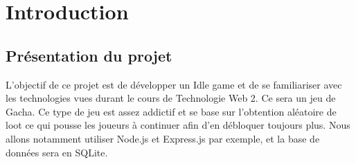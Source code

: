 \section{Introduction}

  \subsection{Présentation du projet}

    L'objectif de ce projet est de développer un Idle game et de se familiariser avec les technologies vues durant le cours de Technologie Web 2. Ce sera un jeu de Gacha. Ce type de jeu est assez addictif et se base sur l'obtention aléatoire de loot ce qui pousse les joueurs à continuer afin d'en débloquer toujours plus. Nous allons notamment utiliser Node.js et Express.js par exemple, et la base de données sera en SQLite.
